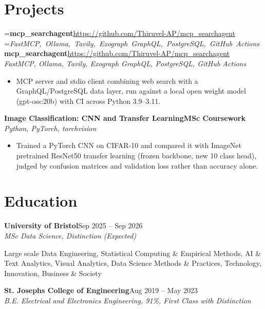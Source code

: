 \documentclass[a4paper,11pt]{article}
\newcommand{\roleNoLoc}[3]{\textbf{#1}\hfill{\color{muted}#2}\\ \textit{#3}\par}
\newcommand{\project}[3]{%
  \textbf{#1}\hfill#3\\ {\color{muted}\small\textit{#2}}\par}
\newcommand{\badge}[1]{{\color{navy}\small\textbf{#1}}}
\newcommand{\gap}{\vspace{5pt}}
\begin{document}
\section{Projects}
=\hbox{\textbf{mcp\_searchagent}\hspace{1em}\url{https://github.com/Thiruvel-AP/mcp_searchagent}}%
=\hbox{{\small\textit{FastMCP, Ollama, Tavily, Exograph GraphQL, PostgreSQL, GitHub Actions}}}%
\ifdim\wd0>\linewidth
\ifdim\wd2>\linewidth
\textbf{mcp\_searchagent}\\ {\color{muted}\small\textit{FastMCP, Ollama, Tavily, Exograph GraphQL, PostgreSQL, GitHub Actions}}\\ \hfill{\small\url{https://github.com/Thiruvel-AP/mcp_searchagent}}\par
\else
\textbf{mcp\_searchagent}\\ {\color{muted}\small\textit{FastMCP, Ollama, Tavily, Exograph GraphQL, PostgreSQL, GitHub Actions}}\hfill{\small\url{https://github.com/Thiruvel-AP/mcp_searchagent}}\par
\fi
\else
\project{mcp\_searchagent}{FastMCP, Ollama, Tavily, Exograph GraphQL, PostgreSQL, GitHub Actions}{\url{https://github.com/Thiruvel-AP/mcp_searchagent}}
\fi
\begin{itemize}
  \item MCP server and stdio client combining web search with a GraphQL/PostgreSQL data layer, run against a local open weight model (gpt-oss:20b) with CI across Python 3.9–3.11.
\end{itemize}
\gap
{}
\project{Image Classification: CNN and Transfer Learning}{Python, PyTorch, torchvision}{\badge{MSc Coursework}}
\begin{itemize}
  \item Trained a PyTorch CNN on CIFAR-10 and compared it with ImageNet pretrained ResNet50 transfer learning (frozen backbone, new 10 class head), judged by confusion matrices and validation loss rather than accuracy alone.
\end{itemize}

\section{Education}
\roleNoLoc{University of Bristol}{Sep 2025 – Sep 2026}{MSc Data Science, Distinction \textit{(Expected)}}
{\color{muted}\small Large scale Data Engineering, Statistical Computing \& Empirical Methods, AI \& Text Analytics, Visual Analytics, Data Science Methods \& Practices, Technology, Innovation, Business \& Society}\par
\gap
{}
\roleNoLoc{St. Joseph\textquotesingle{}s College of Engineering}{Aug 2019 – May 2023}{B.E. Electrical and Electronics Engineering, 91\%, First Class with Distinction}
\end{document}

